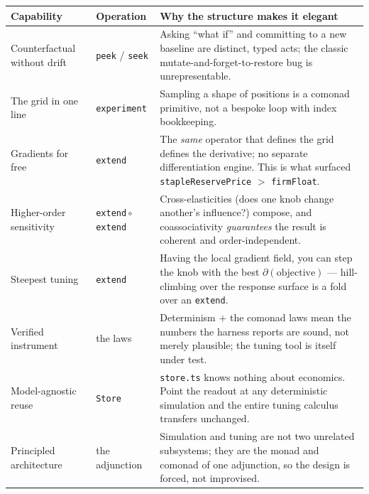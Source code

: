 \documentclass[11pt]{article}
\begin{document}
\begin{center}
\renewcommand{\arraystretch}{1.25}
\begin{tabular}{@{}p{4.3cm}p{2.6cm}p{6.9cm}@{}}
\toprule
Capability & Operation & Why the structure makes it elegant \\
\midrule
Counterfactual without drift &
\texttt{peek} / \texttt{seek} &
Asking ``what if'' and committing to a new baseline are distinct, typed acts;
the classic mutate-and-forget-to-restore bug is unrepresentable. \\

The grid in one line &
\texttt{experiment} &
Sampling a shape of positions is a comonad primitive, not a bespoke loop with
index bookkeeping. \\

Gradients for free &
\texttt{extend} &
The \emph{same} operator that defines the grid defines the derivative; no
separate differentiation engine. This is what surfaced
\texttt{stapleReservePrice} $>$ \texttt{firmFloat}. \\

Higher-order sensitivity &
\texttt{extend}\,$\circ$\,\texttt{extend} &
Cross-elasticities (does one knob change another's influence?) compose, and
coassociativity \emph{guarantees} the result is coherent and order-independent. \\

Steepest tuning &
\texttt{extend} &
Having the local gradient field, you can step the knob with the best
$\partial(\text{objective})$ --- hill-climbing over the response surface is a
fold over an \texttt{extend}. \\

Verified instrument &
the laws &
Determinism $+$ the comonad laws mean the numbers the harness reports are sound,
not merely plausible; the tuning tool is itself under test. \\

Model-agnostic reuse &
\texttt{Store} &
\texttt{store.ts} knows nothing about economics. Point the readout at any
deterministic simulation and the entire tuning calculus transfers unchanged. \\

Principled architecture &
the adjunction &
Simulation and tuning are not two unrelated subsystems; they are the monad and
comonad of one adjunction, so the design is forced, not improvised. \\
\bottomrule
\end{tabular}
\end{center}
\end{document}
